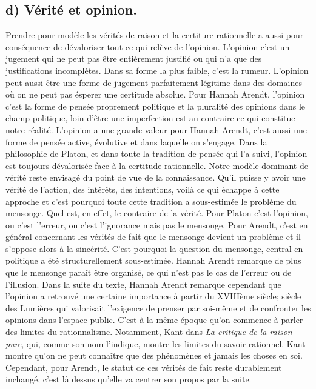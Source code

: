 \documentclass[12pt]{article}
\begin{document}
\subsection*{d) Vérité et opinion.}
Prendre pour modèle les vérités de raison et la certiture rationnelle a aussi pour conséquence de dévaloriser tout ce qui relève de l'opinion.
L'opinion c'est un jugement qui ne peut pas être entièrement justifié ou qui n'a que des justifications incomplètes.
Dans sa forme la plus faible, c'est la rumeur.
L'opinion peut aussi être une forme de jugement parfaitement légitime dans des domaines où on ne peut pas ésperer une certitude absolue.
Pour Hannah Arendt, l'opinion c'est la forme de pensée proprement politique et la pluralité des opinions dans le champ politique, loin d'être une imperfection est au contraire ce qui constitue notre réalité.
L'opinion a une grande valeur pour Hannah Arendt, c'est aussi une forme de pensée active, évolutive et dans laquelle on s'engage.
Dans la philosophie de Platon, et dans toute la tradition de pensée qui l'a suivi, l'opinion est toujours dévalorisée face à la certitude rationnelle.
Notre modèle dominant de vérité reste envisagé du point de vue de la connaissance.
Qu'il puisse y avoir une vérité de l'action, des intérêts, des intentions, voilà ce qui échappe à cette approche et c'est pourquoi toute cette tradition a sous-estimée le problème du mensonge.
Quel est, en effet, le contraire de la vérité.
Pour Platon c'est l'opinion, ou c'est l'erreur, ou c'est l'ignorance mais pas le mensonge.
Pour Arendt, c'est en général concernant les vérités de fait que le mensonge devient un problème et il s'oppose alors à la sincérité.
C'est pourquoi la question du mensonge, central en politique a été structurellement sous-estimée.
Hannah Arendt remarque de plus que le mensonge paraît être organisé, ce qui n'est pas le cas de l'erreur ou de l'illusion.
Dans la suite du texte, Hannah Arendt remarque cependant que l'opinion a retrouvé une certaine importance à partir du XVIIIème siècle; siècle des Lumières qui valorisait l'exigence de prenser par soi-même et de confronter les opinions dans l'espace public.
C'est à la même époque qu'on commence à parler des limites du rationnalisme.
Notamment, Kant dans \emph{La critique de la raison pure}, qui, comme son nom l'indique, montre les limites du savoir rationnel.
Kant montre qu'on ne peut connaître que des phénomènes et jamais les choses en soi.
Cependant, pour Arendt, le statut de ces vérités de fait reste durablement inchangé, c'est là dessus qu'elle va centrer son propos par la suite.
\pagebreak
\end{document}
